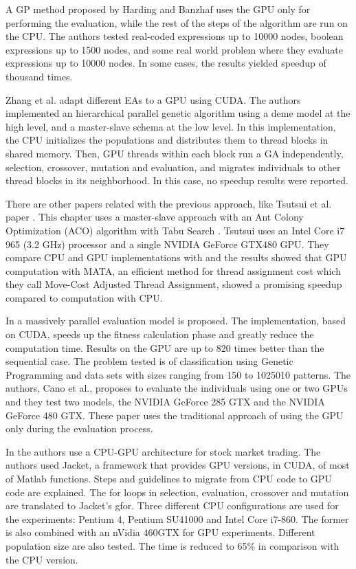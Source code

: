\documentclass[prodmode,acmtecs]{acmsmall}
\begin{document}
A GP method proposed by Harding and Banzhaf \cite{4215552} uses the GPU only for performing the evaluation, while the rest of the steps of the algorithm are run on the CPU. The authors tested real-coded expressions up to 10000 nodes, boolean expressions up to 1500 nodes, and some real world problem where they evaluate expressions up to 10000 nodes. In some cases, the results yielded speedup of thousand times.

Zhang et al. \cite{ZhangImplementationMasterSlave} adapt different EAs to a GPU using CUDA. The authors implemented an hierarchical parallel genetic algorithm using a deme model at the high level, and a master-slave schema at the low level. In this implementation, the CPU initializes the populations and distributes them to thread blocks in shared memory. Then, GPU threads within each block run a GA independently, selection, crossover, mutation and evaluation, and migrates individuals to other thread blocks in its neighborhood. In this case, no speedup results were reported.

There are other papers related with the previous approach, like Tsutsui et al. paper \cite{Tsutsui:2011:GECCO}. This chapter uses a master-slave approach with an Ant Colony Optimization (ACO) algorithm \cite{Dorigo:1999:ACO:329055_329062} with Tabu Search \cite{Glover:1997:TS:549765}. Tsutsui uses an Intel Core i7 965 (3.2 GHz) processor and a single NVIDIA GeForce GTX480 GPU. They compare CPU and GPU implementations with and the results showed that GPU computation with MATA, an efficient method for thread assignment cost which they call Move-Cost Adjusted Thread Assignment, showed a promising speedup compared to computation with CPU.

In \cite{Cano:2012:SUE:2150467.2150468} a massively parallel evaluation model is proposed. The implementation, based on CUDA, speeds up the fitness calculation phase and greatly reduce the computation time. Results on the GPU are up to 820 times better than the sequential case. The problem tested is of classification using Genetic Programming and data sets with sizes ranging from 150 to 1025010 patterns. The authors, Cano et al., proposes to evaluate the individuals using one or two GPUs and they test two models, the NVIDIA GeForce 285 GTX and the NVIDIA GeForce 480 GTX. These paper uses the traditional approach of using the GPU only during the evaluation process.

In \cite{Contreras:2012:UGA:2150467.2150469} the authors use a CPU-GPU architecture for stock market trading. The authors used Jacket, a framework that provides GPU versions, in CUDA, of most of Matlab functions. Steps and guidelines to migrate from CPU code to GPU code are explained. The for loops in selection, evaluation, crossover and mutation are translated to Jacket's gfor. Three different CPU configurations are used for the experiments: Pentium 4, Pentium SU41000 and Intel Core i7-860. The former is also combined with an nVidia 460GTX for GPU experiments. Different population size are also tested. The time is reduced to 65\% in comparison with the CPU version.
\end{document}
